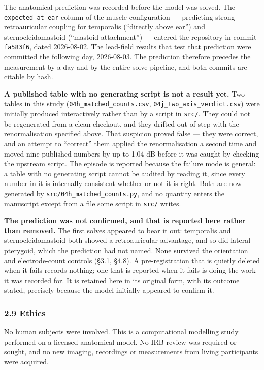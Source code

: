 \documentclass[
  11pt,
]{article}
\begin{document}
The anatomical prediction was recorded before the model was solved. The
\texttt{expected\_at\_ear} column of the muscle configuration --- predicting strong
retroauricular coupling for temporalis (``directly above ear'') and
sternocleidomastoid (``mastoid attachment'') --- entered the repository in commit
\texttt{fa583f6}, dated 2026-08-02. The lead-field results that test that prediction
were committed the following day, 2026-08-03. The prediction therefore precedes
the measurement by a day and by the entire solve pipeline, and both commits are
citable by hash.

\textbf{A published table with no generating script is not a result yet.} Two tables
in this study (\texttt{04h\_matched\_counts.csv}, \texttt{04j\_two\_axis\_verdict.csv}) were
initially produced interactively rather than by a script in \texttt{src/}. They could
not be regenerated from a clean checkout, and they drifted out of step with the
renormalisation specified above. That suspicion proved false --- they were
correct, and an attempt to ``correct'' them applied the renormalisation a second
time and moved nine published numbers by up to 1.04 dB before it was caught by
checking the upstream script. The episode is reported because the failure mode is
general: a table with no generating script cannot be audited by reading it, since
every number in it is internally consistent whether or not it is right. Both are now generated by \texttt{src/04h\_matched\_counts.py}, and no
quantity enters the manuscript except from a file some script in \texttt{src/} writes.

\textbf{The prediction was not confirmed, and that is reported here rather than
removed.} The first solves appeared to bear it out: temporalis and
sternocleidomastoid both showed a retroauricular advantage, and so did lateral
pterygoid, which the prediction had not named. None survived the orientation and
electrode-count controls (§3.1, §4.8). A pre-registration that is quietly deleted
when it fails records nothing; one that is reported when it fails is doing the
work it was recorded for. It is retained here in its original form, with its
outcome stated, precisely because the model initially appeared to confirm it.

\subsubsection{2.9 Ethics}\label{ethics}

No human subjects were involved. This is a computational modelling study
performed on a licensed anatomical model. No IRB review was required or sought,
and no new imaging, recordings or measurements from living participants were
acquired.
\end{document}
